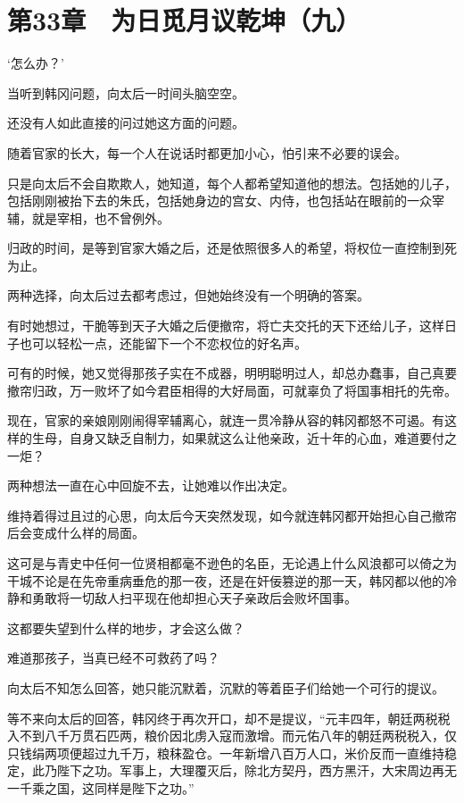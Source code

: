 \section{第33章　为日觅月议乾坤（九）}

‘怎么办？’

当听到韩冈问题，向太后一时间头脑空空。

还没有人如此直接的问过她这方面的问题。

随着官家的长大，每一个人在说话时都更加小心，怕引来不必要的误会。

只是向太后不会自欺欺人，她知道，每个人都希望知道他的想法。包括她的儿子，包括刚刚被抬下去的朱氏，包括她身边的宫女、内侍，也包括站在眼前的一众宰辅，就是宰相，也不曾例外。

归政的时间，是等到官家大婚之后，还是依照很多人的希望，将权位一直控制到死为止。

两种选择，向太后过去都考虑过，但她始终没有一个明确的答案。

有时她想过，干脆等到天子大婚之后便撤帘，将亡夫交托的天下还给儿子，这样日子也可以轻松一点，还能留下一个不恋权位的好名声。

可有的时候，她又觉得那孩子实在不成器，明明聪明过人，却总办蠢事，自己真要撤帘归政，万一败坏了如今君臣相得的大好局面，可就辜负了将国事相托的先帝。

现在，官家的亲娘刚刚闹得宰辅离心，就连一贯冷静从容的韩冈都怒不可遏。有这样的生母，自身又缺乏自制力，如果就这么让他亲政，近十年的心血，难道要付之一炬？

两种想法一直在心中回旋不去，让她难以作出决定。

维持着得过且过的心思，向太后今天突然发现，如今就连韩冈都开始担心自己撤帘后会变成什么样的局面。

这可是与青史中任何一位贤相都毫不逊色的名臣，无论遇上什么风浪都可以倚之为干城不论是在先帝重病垂危的那一夜，还是在奸佞篡逆的那一天，韩冈都以他的冷静和勇敢将一切敌人扫平现在他却担心天子亲政后会败坏国事。

这都要失望到什么样的地步，才会这么做？

难道那孩子，当真已经不可救药了吗？

向太后不知怎么回答，她只能沉默着，沉默的等着臣子们给她一个可行的提议。

等不来向太后的回答，韩冈终于再次开口，却不是提议，“元丰四年，朝廷两税税入不到八千万贯石匹两，粮价因北虏入寇而激增。而元佑八年的朝廷两税税入，仅只钱绢两项便超过九千万，粮秣盈仓。一年新增八百万人口，米价反而一直维持稳定，此乃陛下之功。军事上，大理覆灭后，除北方契丹，西方黑汗，大宋周边再无一千乘之国，这同样是陛下之功。”


